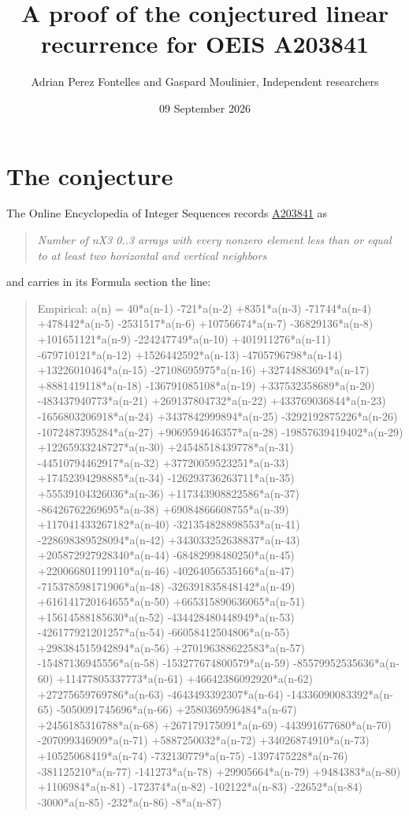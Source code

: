 \documentclass[11pt]{article}
\title{A proof of the conjectured linear recurrence for OEIS A203841}
\author{Adrian Perez Fontelles and Gaspard Moulinier, Independent researchers}
\date{09 September 2026}
\theoremstyle{definition}
\begin{document}
\maketitle
\section{The conjecture}

The Online Encyclopedia of Integer Sequences records \href{https://oeis.org/A203841}{A203841} as

\begin{quote}\itshape Number of nX3 0..3 arrays with every nonzero element less than or equal to at least two horizontal and vertical neighbors\end{quote}

and carries in its Formula section the line:

\begin{quote}\ttfamily Empirical: a(n) = 40*a(n-1) -721*a(n-2) +8351*a(n-3) -71744*a(n-4) +478442*a(n-5) -2531517*a(n-6) +10756674*a(n-7) -36829136*a(n-8) +101651121*a(n-9) -224247749*a(n-10) +401911276*a(n-11) -679710121*a(n-12) +1526442592*a(n-13) -4705796798*a(n-14) +13226010464*a(n-15) -27108695975*a(n-16) +32744883694*a(n-17) +8881419118*a(n-18) -136791085108*a(n-19) +337532358689*a(n-20) -483437940773*a(n-21) +269137804732*a(n-22) +433769036844*a(n-23) -1656803206918*a(n-24) +3437842999894*a(n-25) -3292192875226*a(n-26) -1072487395284*a(n-27) +9069594646357*a(n-28) -19857639419402*a(n-29) +12265933248727*a(n-30) +24548518439778*a(n-31) -44510794462917*a(n-32) +37720059523251*a(n-33) +17452394298885*a(n-34) -126293736263711*a(n-35) +55539104326036*a(n-36) +117343908822586*a(n-37) -86426762269695*a(n-38) +69084866608755*a(n-39) +117041433267182*a(n-40) -321354828898553*a(n-41) -228698389528094*a(n-42) +343033252638837*a(n-43) +205872927928340*a(n-44) -68482998480250*a(n-45) +220066801199110*a(n-46) -40264056535166*a(n-47) -715378598171906*a(n-48) -326391835848142*a(n-49) +616141720164655*a(n-50) +665315890636065*a(n-51) +15614588185630*a(n-52) -434428480448949*a(n-53) -426177921201257*a(n-54) -66058412504806*a(n-55) +298384515942894*a(n-56) +270196388622583*a(n-57) -15487136945556*a(n-58) -153277674800579*a(n-59) -85579952535636*a(n-60) +11477805337773*a(n-61) +46642386092920*a(n-62) +27275659769786*a(n-63) -4643493392307*a(n-64) -14336090083392*a(n-65) -5050091745696*a(n-66) +2580369596484*a(n-67) +2456185316788*a(n-68) +267179175091*a(n-69) -443991677680*a(n-70) -207099346909*a(n-71) +5887250032*a(n-72) +34026874910*a(n-73) +10525068419*a(n-74) -732130779*a(n-75) -1397475228*a(n-76) -381125210*a(n-77) -141273*a(n-78) +29905664*a(n-79) +9484383*a(n-80) +1106984*a(n-81) -172374*a(n-82) -102122*a(n-83) -22652*a(n-84) -3000*a(n-85) -232*a(n-86) -8*a(n-87)\end{quote}
\end{document}
